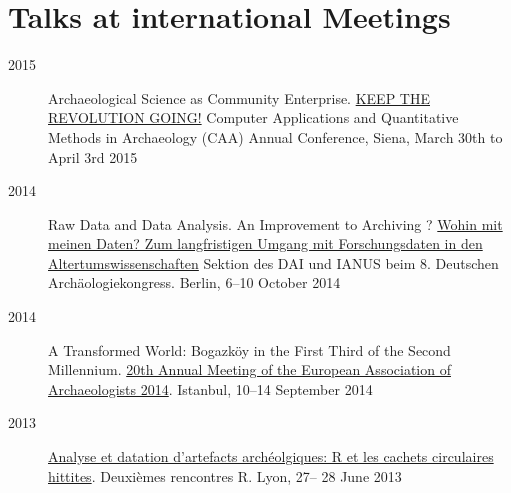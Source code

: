 \section{Talks at international Meetings}

\begin{description} 
 
  \item[2015] Archaeological Science as Community Enterprise.
    \href{http://caaconference.org/}{KEEP THE REVOLUTION GOING!} Computer
    Applications and Quantitative Methods in Archaeology (CAA) Annual
    Conference, Siena, March 30th to April 3rd 2015

  \item[2014] Raw Data and Data Analysis. An Improvement to Archiving ?
    \href{http://www.ianus-fdz.de/projects/veranstaltungen/wiki/Wohin_mit_meinen_Daten}{Wohin
    mit meinen Daten? Zum langfristigen Umgang mit Forschungsdaten in den
  Altertumswissenschaften} Sektion des DAI und IANUS beim 8. Deutschen
  Archäologiekongress. Berlin, 6--10 October 2014

  \item[2014] A Transformed World: Bogazköy in the First Third of the Second
    Millennium.  \href{https://www.eaa2014istanbul.org/site}{20th Annual Meeting
    of the European Association of Archaeologists 2014}. Istanbul, 10--14
    September 2014

  \item[2013] \href{http://r2013-lyon.sciencesconf.org/18862}{Analyse et
datation d'artefacts archéolgiques: R et les cachets circulaires hittites}.
Deuxièmes rencontres R. Lyon, 27-- 28 June 2013 \end{description}
